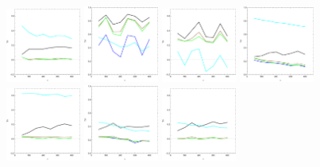 \documentclass[
twoside,
openright,
titlepage,
numbers=noenddot,
headinclude,%
footinclude=true,
dottedtoc, %
ngerman,
american, %
pagesize=pdftex,
]{book}
\begin{document}
\begin{example}
\begin{figure}[H]
			\includegraphics[width=0.22\textwidth]{figures/2+3Dexample/e3n2}
			\includegraphics[width=0.22\textwidth]{figures/2+3Dexample/e3t1}
			\includegraphics[width=0.22\textwidth]{figures/2+3Dexample/e3t2}
			\includegraphics[width=0.22\textwidth]{figures/2+3Dexample/e3l1}
			\includegraphics[width=0.22\textwidth]{figures/2+3Dexample/e3l2}
			\includegraphics[width=0.22\textwidth]{figures/2+3Dexample/e3sn1}
			\includegraphics[width=0.22\textwidth]{figures/2+3Dexample/e3sn2}

\end{figure}
\end{example}
\end{document}
